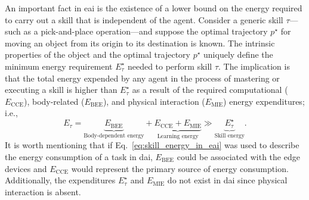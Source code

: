 \documentclass[12pt]{article}
\begin{document}
An important fact in \ac{eai} is the existence of a lower bound on the energy required to carry out a skill that is independent of the agent. Consider a generic skill $\tau$---such as a pick-and-place operation---and suppose the optimal trajectory $p^\star$ for moving an object from its origin to its destination is known. The intrinsic properties of the object and the optimal trajectory $p^\star$ uniquely define the minimum energy requirement $E^\star_{\tau}$ needed to perform skill $\tau$. The implication is that the total energy expended by any agent in the process of mastering or executing a skill is higher than $E^\star_{\tau}$ as a result of the required computational ($E_\text{CCE}$), body-related ($E_\text{BEE}$), and physical interaction ($E_\text{MIE}$) energy expenditures; i.e.,
\begin{equation}\label{eq:skill_energy_in_eai}
	E_{\tau} =  \underbrace{E_\text{BEE}}_{\text{Body-dependent energy}} + \underbrace{E_\text{CCE} + E_\text{MIE}}_{\text{Learning energy}} \gg \underbrace{E^\star_{\tau}}_{\text{Skill energy}} .
\end{equation}
It is worth mentioning that if Eq.~\eqref{eq:skill_energy_in_eai} was used to describe the energy consumption of a task in \ac{dai}, $E_\text{BEE}$ could be associated with the edge devices and $E_\text{CCE}$ would represent the primary source of energy consumption. Additionally, the expenditures $E^\star_{\tau}$ and $E_\text{MIE}$ do not exist in \ac{dai} since physical interaction is absent.

\end{document}
